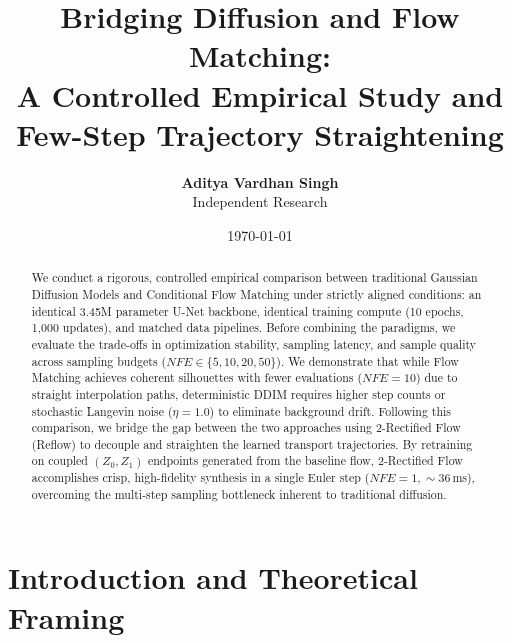 \documentclass[11pt,a4paper]{article}
\title{\textbf{Bridging Diffusion and Flow Matching: \\ A Controlled Empirical Study and Few-Step Trajectory Straightening}}
\author{\textbf{Aditya Vardhan Singh} \\ \small Independent Research}
\date{\today}
\begin{document}
\maketitle

\begin{abstract}
We conduct a rigorous, controlled empirical comparison between traditional Gaussian Diffusion Models and Conditional Flow Matching under strictly aligned conditions: an identical 3.45M parameter U-Net backbone, identical training compute (10 epochs, 1,000 updates), and matched data pipelines. Before combining the paradigms, we evaluate the trade-offs in optimization stability, sampling latency, and sample quality across sampling budgets ($NFE \in \{5, 10, 20, 50\}$). We demonstrate that while Flow Matching achieves coherent silhouettes with fewer evaluations ($NFE=10$) due to straight interpolation paths, deterministic DDIM requires higher step counts or stochastic Langevin noise ($\eta=1.0$) to eliminate background drift. Following this comparison, we bridge the gap between the two approaches using 2-Rectified Flow (Reflow) to decouple and straighten the learned transport trajectories. By retraining on coupled $(Z_0, Z_1)$ endpoints generated from the baseline flow, 2-Rectified Flow accomplishes crisp, high-fidelity synthesis in a single Euler step ($NFE=1, \sim 36$\,ms), overcoming the multi-step sampling bottleneck inherent to traditional diffusion.
\end{abstract}

\section{Introduction and Theoretical Framing}
\end{document}
